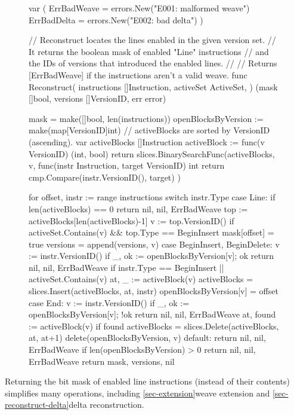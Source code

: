 \documentclass{article}
\begin{document}
\begin{figure}
\begin{code}[go]
var (
	ErrBadWeave = errors.New("E001: malformed weave")
	ErrBadDelta = errors.New("E002: bad delta")
)

// Reconstruct locates the lines enabled in the given version set.
// It returns the boolean mask of enabled "Line" instructions
// and the IDs of versions that introduced the enabled lines.
//
// Returns [ErrBadWeave] if the instructions aren't a valid weave.
func Reconstruct(
	instructions []Instruction,
	activeSet ActiveSet,
) (mask []bool, versions []VersionID, err error) {
	mask = make([]bool, len(instructions))
	openBlocksByVersion := make(map[VersionID]int)
	// activeBlocks are sorted by VersionID (ascending).
	var activeBlocks []Instruction
	activeBlock := func(v VersionID) (int, bool) {
		return slices.BinarySearchFunc(activeBlocks, v,
			func(instr Instruction, target VersionID) int {
				return cmp.Compare(instr.VersionID(), target)
			})
	}

	for offset, instr := range instructions {
		switch instr.Type {
		case Line:
			if len(activeBlocks) == 0 {
				return nil, nil, ErrBadWeave
			}
			top := activeBlocks[len(activeBlocks)-1]
			v := top.VersionID()
			if activeSet.Contains(v) && top.Type == BeginInsert {
				mask[offset] = true
				versions = append(versions, v)
			}
		case BeginInsert, BeginDelete:
			v := instr.VersionID()
			if _, ok := openBlocksByVersion[v]; ok {
				return nil, nil, ErrBadWeave
			}
			if instr.Type == BeginInsert || activeSet.Contains(v) {
				at, _ := activeBlock(v)
				activeBlocks = slices.Insert(activeBlocks, at, instr)
			}
			openBlocksByVersion[v] = offset
		case End:
			v := instr.VersionID()
			if _, ok := openBlocksByVersion[v]; !ok {
				return nil, nil, ErrBadWeave
			}
			at, found := activeBlock(v)
			if found {
				activeBlocks = slices.Delete(activeBlocks, at, at+1)
			}
			delete(openBlocksByVersion, v)
		default:
			return nil, nil, ErrBadWeave
		}
	}
	if len(openBlocksByVersion) > 0 {
		return nil, nil, ErrBadWeave
	}
	return mask, versions, nil
}
\end{code}
\end{figure}

Returning the bit mask of enabled line instructions (instead of their contents)
simplifies many operations,
including \ref{sec-extension}{weave extension} and \ref{sec-reconstruct-delta}{delta reconstruction}.
\end{document}

